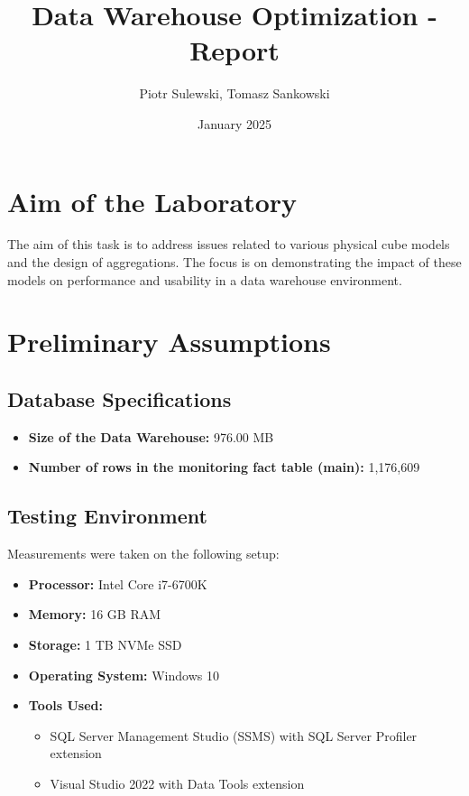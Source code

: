 \documentclass[a4paper,12pt]{article} %
\title{\textbf{Data Warehouse Optimization - Report}}
\author{Piotr Sulewski, Tomasz Sankowski}
\date{January 2025}
\begin{document}
\maketitle
\tableofcontents 
\newpage

\section{Aim of the Laboratory}
The aim of this task is to address issues related to various physical cube models and the design of aggregations. The focus is on demonstrating the impact of these models on performance and usability in a data warehouse environment.

\section{Preliminary Assumptions}

\subsection{Database Specifications}
\begin{itemize}
    \item \textbf{Size of the Data Warehouse:} 976.00 MB
    \item \textbf{Number of rows in the monitoring fact table (main):} 1,176,609
\end{itemize}

\subsection{Testing Environment}
Measurements were taken on the following setup:
\begin{itemize}
    \item \textbf{Processor:} Intel Core i7-6700K
    \item \textbf{Memory:} 16 GB RAM
    \item \textbf{Storage:} 1 TB NVMe SSD
    \item \textbf{Operating System:} Windows 10
    \item \textbf{Tools Used:}
    \begin{itemize}
        \item SQL Server Management Studio (SSMS) with SQL Server Profiler extension
        \item Visual Studio 2022 with Data Tools extension
    \end{itemize}
\end{itemize}
\end{document}
